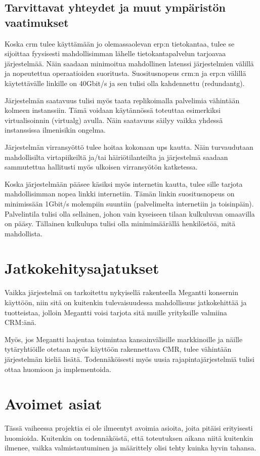     \subsection{Tarvittavat yhteydet ja muut ympäristön vaatimukset}  %
        Koska \gls{crm} tulee käyttämään jo olemassaolevan \gls{erp}:n tietokantaa, tulee se sijoittaa fyysisesti mahdollisimman lähelle tietokantapalvelun
        tarjoavaa järjestelmää. Näin saadaan minimoitua mahdollinen latenssi järjestelmien välillä ja nopeutettua operaatioiden suoritusta. Suositusnopeus 
        \gls{crm}:n ja \gls{erp}:n välillä käytettävälle linkille on 40Gbit/s ja sen tulisi olla kahdennettu (\gls{redundantg}). \cite{crm}

        Järjestelmän saatavuus tulisi myös taata replikoimalla palvelimia vähintään kolmeen instanssiin. Tämä voidaan käytännössä toteuttaa esimerkiksi virtualisoinnin 
        (\gls{virtualg}) avulla. Näin saatavuus säilyy vaikka yhdessä instanssissa ilmenisikin ongelma. 
        
        Järjestelmän virransyöttö tulee hoitaa kokonaan \gls{ups} kautta. Näin turvaudutaan mahdollisilta virtapiikeiltä ja/tai häiriötilanteilta ja järjestelmä saadaan
        sammutettua hallitusti myös ulkoisen virransyötön katketessa. 
        
        Koska järjestelmään pääsee käsiksi myös internetin kautta, tulee sille tarjota mahdollisimman nopea linkki internetiin. Tämän linkin suositusnopeus on minimissään 
        1Gbit/s molempiin suuntiin (palvelimelta internetiin ja toisinpäin). 
        Palvelintila tulisi olla sellainen, johon vain kyseiseen tilaan kulkuluvan omaavilla on pääsy. Tällainen kulkulupa tulisi olla minimimäärällä henkilöstöä, mitä mahdollista. 

\section{Jatkokehitysajatukset}     %

    Vaikka järjestelmä on tarkoitettu nykyisellä rakenteella Megantti konsernin käyttöön, niin sitä on kuitenkin tulevaisuudessa
    mahdollisuus jatkokehittää ja tuotteistaa, jolloin Megantti voisi tarjota sitä muille yrityksille valmiina CRM:änä.

    Myös, jos Megantti laajentaa toimintaa kansainvälisille markkinoille ja näille tytäryhtiöille otetaan myös käyttöön rakennettava
    CMR, tulee vähintään järjestelmän kieliä lisätä. Todennäköisesti myös uusia rajapintajärjestelmiä tulisi ottaa huomioon ja implementoida.

\section{Avoimet asiat}     %

    Tässä vaiheessa projektia ei ole ilmeentyt avoimia asioita, joita pitäisi erityisesti huomioida. Kuitenkin on todennäköistä, että toteutuksen aikana niitä kuitenkin
    ilmenee, vaikka valmistautuminen ja määrittely olisi tehty kuinka hyvin tahansa.




   
